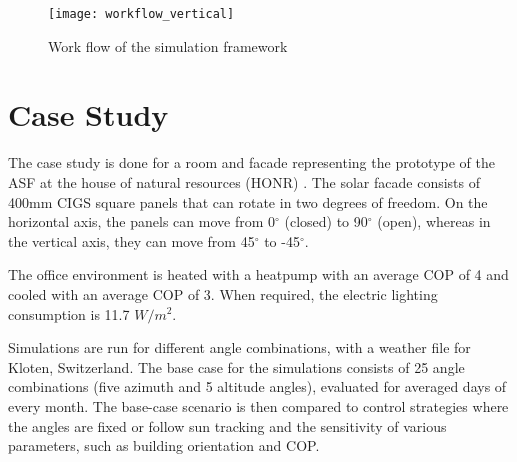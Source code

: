 		\begin{figure}[ht] %
		\begin{center}
			\texttt{[image: workflow\_vertical]}
			\caption{Work flow of the simulation framework}
			\label{fig:workflow}
		\end{center} 
		\end{figure}

	\section{Case Study}

		The case study is done for a room and facade representing the prototype of the ASF at the house of natural resources (HONR) \cite{nagy2015frontiers}.  The solar facade consists of 400mm CIGS square panels that can rotate in two degrees of freedom. On the horizontal axis, the panels can move from 0$^{\circ}$ (closed) to 90$^{\circ}$ (open), whereas in the vertical axis, they can move from 45$^{\circ}$ to -45$^{\circ}$. %

		The office environment is heated with a heatpump with an average COP of 4 and cooled with an average COP of 3. When required, the electric lighting consumption is 11.7 $W/m^2$. 


		Simulations are run for different angle combinations, with a weather file for Kloten, Switzerland. The base case for the simulations consists of 25 angle combinations (five azimuth and 5 altitude angles), evaluated for averaged days of every month. The base-case scenario is then compared to control strategies where the angles are fixed or follow sun tracking and the sensitivity of various parameters, such as building orientation and COP. 



